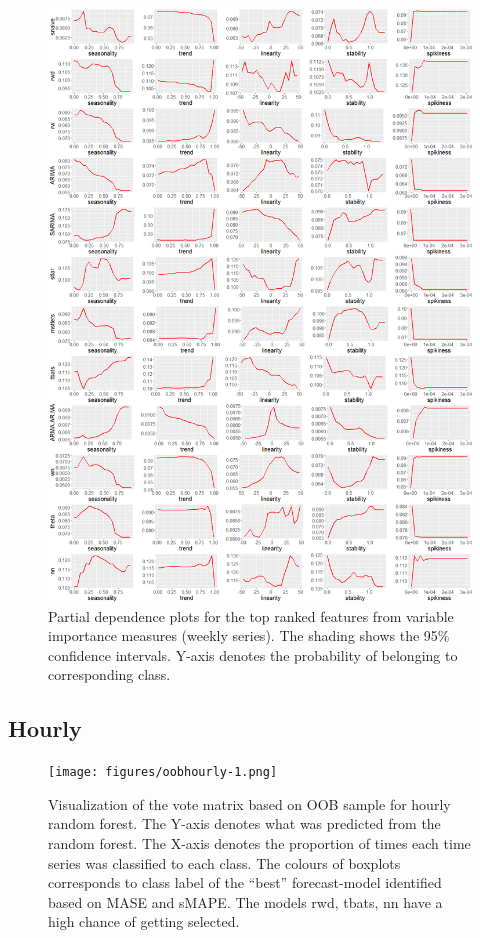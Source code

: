 \documentclass[11pt,a4paper,]{article}
\begin{document}
\begin{figure}
\centering
\includegraphics{figures/weeklypdp-1.png}
\caption{\label{fig:weeklypdp}Partial dependence plots for the top ranked
features from variable importance measures (weekly series). The shading
shows the 95\% confidence intervals. Y-axis denotes the probability of
belonging to corresponding class.}
\end{figure}

\subsection{Hourly}\label{hourly}

\begin{figure}
\centering
\texttt{[image: figures/oobhourly-1.png]}
\caption{\label{fig:oobhourly}Visualization of the vote matrix based on OOB
sample for hourly random forest. The Y-axis denotes what was predicted
from the random forest. The X-axis denotes the proportion of times each
time series was classified to each class. The colours of boxplots
corresponds to class label of the ``best'' forecast-model identified
based on MASE and sMAPE. The models rwd, tbats, nn have a high chance of
getting selected.}
\end{figure}
\end{document}
